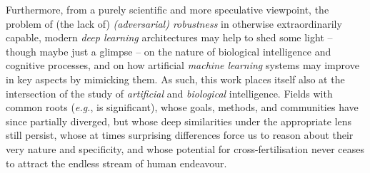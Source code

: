 Furthermore, from a purely scientific and more speculative viewpoint, the problem of (the lack of) \textit{(adversarial) robustness} in otherwise extraordinarily capable, modern \textit{deep learning} architectures may help to shed some light -- though maybe just a glimpse -- on the nature of biological intelligence and cognitive processes, and on how artificial \textit{machine learning} systems may improve in key aspects by mimicking them. As such, this work places itself also at the intersection of the study of \textit{artificial} and \textit{biological} intelligence. Fields with common roots (\textit{e.g.}, \cite{McCullochPitts1990ALC} is significant), whose goals, methods, and communities have since partially diverged, but whose deep similarities under the appropriate lens still persist, whose at times surprising differences force us to reason about their very nature and specificity, and whose potential for cross-fertilisation never ceases to attract the endless stream of human endeavour.